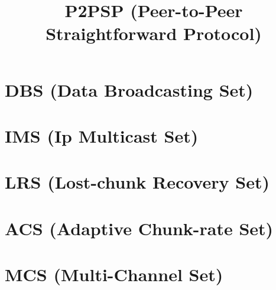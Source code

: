 \title{P2PSP (Peer-to-Peer Straightforward Protocol)}
\maketitle
\tableofcontents

\begin{abstract}

\end{abstract}

\section{DBS (Data Broadcasting Set)}
\label{sec:DBL}


\section{IMS (Ip Multicast Set)}
\label{sec:IMS}


\section{LRS (Lost-chunk Recovery Set)}
\label{sec:LRS}


\section{ACS (Adaptive Chunk-rate Set)}
\label{sec:ACS}


\section{MCS (Multi-Channel Set)}
\label{sec:MCS}



